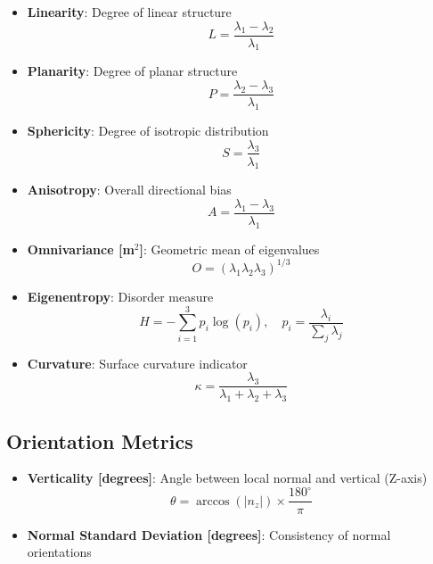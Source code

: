 \documentclass[12pt]{article}
\begin{document}
\begin{itemize}
    \item \textbf{Linearity}: Degree of linear structure
    \begin{equation}
        L = \frac{\lambda_1 - \lambda_2}{\lambda_1}
    \end{equation}

    \item \textbf{Planarity}: Degree of planar structure
    \begin{equation}
        P = \frac{\lambda_2 - \lambda_3}{\lambda_1}
    \end{equation}

    \item \textbf{Sphericity}: Degree of isotropic distribution
    \begin{equation}
        S = \frac{\lambda_3}{\lambda_1}
    \end{equation}

    \item \textbf{Anisotropy}: Overall directional bias
    \begin{equation}
        A = \frac{\lambda_1 - \lambda_3}{\lambda_1}
    \end{equation}

    \item \textbf{Omnivariance [m$^2$]}: Geometric mean of eigenvalues
    \begin{equation}
        O = (\lambda_1 \lambda_2 \lambda_3)^{1/3}
    \end{equation}

    \item \textbf{Eigenentropy}: Disorder measure
    \begin{equation}
        H = -\sum_{i=1}^{3} p_i \log(p_i), \quad p_i = \frac{\lambda_i}{\sum_j \lambda_j}
    \end{equation}

    \item \textbf{Curvature}: Surface curvature indicator
    \begin{equation}
        \kappa = \frac{\lambda_3}{\lambda_1 + \lambda_2 + \lambda_3}
    \end{equation}
\end{itemize}

\subsection{Orientation Metrics}
\begin{itemize}
    \item \textbf{Verticality [degrees]}: Angle between local normal and vertical (Z-axis)
    \begin{equation}
        \theta = \arccos(|n_z|) \times \frac{180^\circ}{\pi}
    \end{equation}
    \item \textbf{Normal Standard Deviation [degrees]}: Consistency of normal orientations
\end{itemize}
\end{document}
